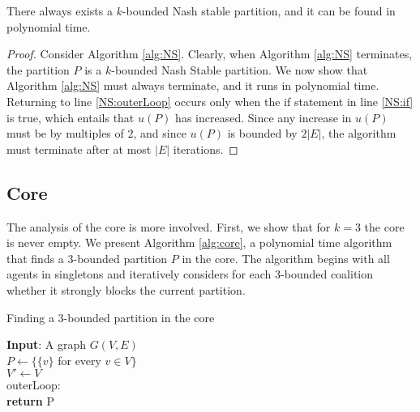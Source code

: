 \documentclass[sigconf,anonymous]{aamas}
\begin{document}
\begin{theorem}
There always exists a $k$-bounded Nash stable partition, and it can be found in polynomial time.
\end{theorem}

\begin{proof}
Consider Algorithm \ref{alg:NS}.
Clearly, when Algorithm \ref{alg:NS} terminates, the partition $P$ is a $k$-bounded Nash Stable partition.
We now show that Algorithm \ref{alg:NS} must always terminate, and it runs in polynomial time.
Returning to line \ref{NS:outerLoop} occurs only when the if statement in line \ref{NS:if} is true, which entails that $u(P)$ has increased. Since any increase in $u(P)$ must be by multiples of $2$, and since $u(P)$ is bounded by $2|E|$, the algorithm must terminate after at most $|E|$ iterations.
\end{proof}




\subsection{Core}
The analysis of the core is more involved.
First, we show that for $k=3$ the core is never empty. We present Algorithm \ref{alg:core}, a polynomial time algorithm that finds a $3$-bounded partition $P$ in the core. The algorithm begins with all agents in singletons and iteratively considers for each $3$-bounded coalition whether it strongly blocks the current partition.

\begin{algorithm}[ht]
    \caption{Finding a $3$-bounded partition in the core}
    \label{alg:core}
    \SetAlgoLined
    \textbf{Input}:
    A graph $G(V,E)$\\
    $P \leftarrow \{\{v\}$ for every $v \in V\}$\\
    $V' \leftarrow V$\\
    outerLoop:\\ 
    \label{core:outerLoop}
        \textbf{return} P
\end{algorithm}
\end{document}
